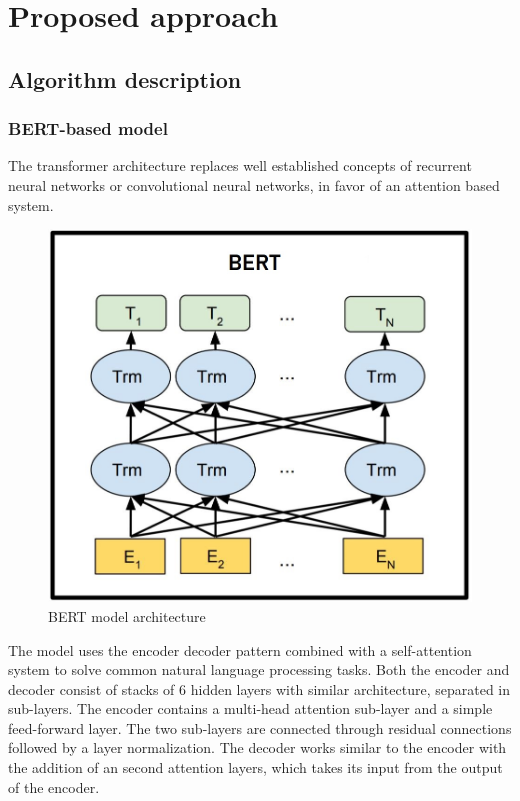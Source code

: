 \documentclass[runningheads,a4paper,11pt]{report}
\begin{document}
\chapter{Proposed approach}
\label{chapter:proposedApproach}

\section{Algorithm description}
\label{section:algorithmDescription}

\subsection{BERT-based model}
\label{section:bertModels}

	The transformer architecture \cite{att17} replaces well established concepts of recurrent neural networks or convolutional neural networks, in favor of an attention based system. 

\begin{figure}[h]
\centerline{\includegraphics[width=12cm]{bert}}  
	\caption{BERT model architecture}
	\label{bertModel}
\end{figure}

	The model uses the encoder decoder pattern combined with a self-attention system to solve common natural language processing tasks.	Both the encoder and decoder consist of stacks of 6 hidden layers with similar architecture, separated in sub-layers. The encoder contains a multi-head attention sub-layer and a simple feed-forward layer. The two sub-layers are connected through residual connections followed by a layer normalization. The decoder works similar to the encoder with the addition of an second attention layers, which takes its input from the output of the encoder. 
	
\end{document}
